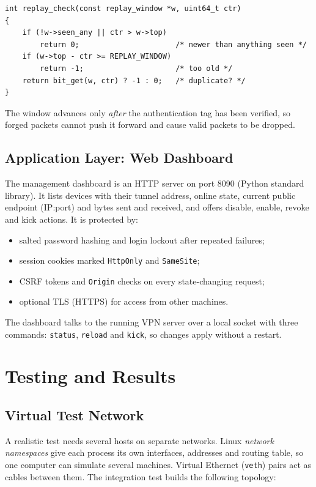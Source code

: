 \documentclass[12pt,a4paper]{report}
\begin{document}
\begin{lstlisting}[caption={Replay check (\texttt{src/replay.c})}]
int replay_check(const replay_window *w, uint64_t ctr)
{
    if (!w->seen_any || ctr > w->top)
        return 0;                      /* newer than anything seen */
    if (w->top - ctr >= REPLAY_WINDOW)
        return -1;                     /* too old */
    return bit_get(w, ctr) ? -1 : 0;   /* duplicate? */
}
\end{lstlisting}
The window advances only \emph{after} the authentication tag has been verified, so
forged packets cannot push it forward and cause valid packets to be dropped.

\section{Application Layer: Web Dashboard}
The management dashboard is an HTTP server on port 8090 (Python standard library). It
lists devices with their tunnel address, online state, current public endpoint
(IP:port) and bytes sent and received, and offers disable, enable, revoke and kick
actions. It is protected by:
\begin{itemize}
  \item salted password hashing and login lockout after repeated failures;
  \item session cookies marked \texttt{HttpOnly} and \texttt{SameSite};
  \item CSRF tokens and \texttt{Origin} checks on every state-changing request;
  \item optional TLS (HTTPS) for access from other machines.
\end{itemize}
The dashboard talks to the running VPN server over a local socket with three commands:
\texttt{status}, \texttt{reload} and \texttt{kick}, so changes apply without a restart.

\chapter{Testing and Results}\label{ch:testing}

\section{Virtual Test Network}
A realistic test needs several hosts on separate networks. Linux \emph{network
namespaces} give each process its own interfaces, addresses and routing table, so one
computer can simulate several machines. Virtual Ethernet (\texttt{veth}) pairs act as
cables between them. The integration test builds the following topology:
\end{document}
